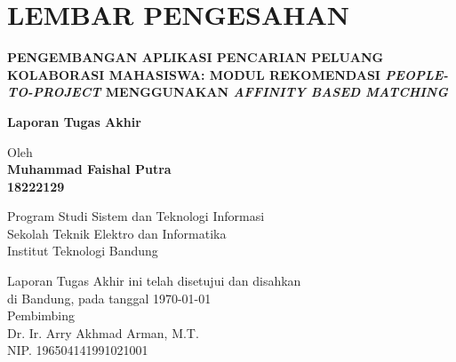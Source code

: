 \chapter*{LEMBAR PENGESAHAN}


\begin{center}
    \vspace{1.5cm}
  {\large\bfseries PENGEMBANGAN APLIKASI PENCARIAN PELUANG KOLABORASI MAHASISWA: MODUL REKOMENDASI \emph{PEOPLE-TO-PROJECT} MENGGUNAKAN \emph{AFFINITY BASED MATCHING}}\\
     \vspace{1.5cm}

  {\Large \textbf{Laporan Tugas Akhir}}\\


  \vspace{1.5cm}
    
    
  {\large Oleh}\\[0.3cm]
    \textbf{
    {\large Muhammad Faishal Putra}\\
    {\large 18222129}
  }\\
    
  \vspace{0.5cm}
 
  {\large Program Studi Sistem dan Teknologi Informasi}\\
  {\large Sekolah Teknik Elektro dan Informatika}\\
  {\large Institut Teknologi Bandung}\\

  \vspace{1.5cm}

  Laporan Tugas Akhir ini telah disetujui dan disahkan\\ 
  di Bandung, pada tanggal \today\\[1cm]

	Pembimbing  \\[3cm]
	Dr. Ir. Arry Akhmad Arman, M.T.   \\[0.2cm]
	NIP. 196504141991021001

\end{center}

\vspace{1cm}
\noindent



